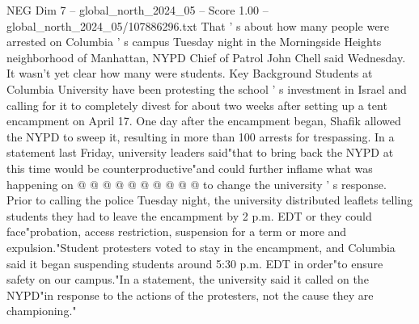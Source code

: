 \begin{textsample}{NEG Dim 7 – global\_north\_2024\_05 – Score 1.00 – global\_north\_2024\_05/107886296.txt}
That ' s about how many people were arrested on Columbia ' s campus Tuesday night in the Morningside Heights neighborhood of Manhattan, NYPD Chief of Patrol John Chell said Wednesday.
It wasn't yet clear how many were students.
Key Background Students at Columbia University have been protesting the school ' s investment in Israel and calling for it to completely divest for about two weeks after setting up a tent encampment on April 17.
One day after the encampment began, Shafik allowed the NYPD to sweep it, resulting in more than 100 arrests for trespassing.
In a statement last Friday, university leaders said"that to bring back the NYPD at this time would be counterproductive"and could further inflame what was happening on @ @ @ @ @ @ @ @ @ @ to change the university ' s response.
Prior to calling the police Tuesday night, the university distributed leaflets telling students they had to leave the encampment by 2 p.m.
EDT or they could face"probation, access restriction, suspension for a term or more and expulsion."Student protesters voted to stay in the encampment, and Columbia said it began suspending students around 5:30 p.m.
EDT in order"to ensure safety on our campus."In a statement, the university said it called on the NYPD"in response to the actions of the protesters, not the cause they are championing."

\end{textsample}
